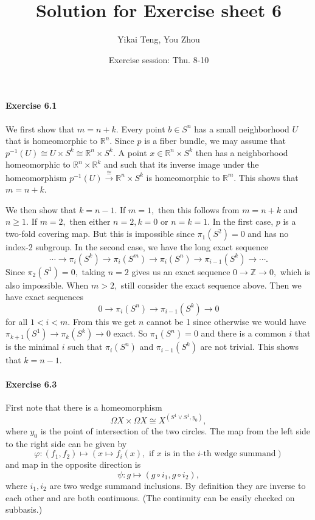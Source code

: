 \documentclass{article}
\title{Solution for Exercise sheet 6}
\author{Yikai Teng, You Zhou}
\date{Exercise session: Thu. 8-10}
\begin{document}
\maketitle
\paragraph{Exercise 6.1}We first show that $m=n+k.$ Every point $b\in S^n$ has a small neighborhood $U$ that is homeomorphic to $\mathbb{R}^n.$ Since $p$ is a fiber bundle, we may assume that $p^{-1}(U)\cong U\times S^k\cong\mathbb{R}^n\times S^k.$ A point $x\in\mathbb{R}^n\times S^k$ then has a neighborhood homeomorphic to $\mathbb{R}^n\times\mathbb{R}^k$ and such that its inverse image under the homeomorphism $p^{-1}(U)\xrightarrow{\cong}\mathbb{R}^n\times S^k$ is homeomorphic to $\mathbb{R}^m.$ This shows that $m=n+k.$

We then show that $k=n-1.$ If $m=1,$ then this follows from $m=n+k$ and $n\geq1.$ If $m=2,$ then either $n=2, k=0$ or $n=k=1.$ In the first case, $p$ is a two-fold covering map. But this is impossible since $\pi_1(S^2)=0$ and has no index-2 subgroup. In the second case, we have the long exact sequence
\[\cdots\rightarrow\pi_i(S^k)\rightarrow\pi_i(S^m)\rightarrow\pi_i(S^n)\rightarrow\pi_{i-1}(S^k)\rightarrow\cdots.\]
Since $\pi_2(S^1)=0,$ taking $n=2$ gives us an exact sequence $0\rightarrow\mathbb{Z}\rightarrow0,$ which is also impossible. When $m>2,$ still consider the exact sequence above. Then we have exact sequences
\[0\rightarrow\pi_i(S^n)\rightarrow\pi_{i-1}(S^k)\rightarrow0\]
for all $1<i<m.$ From this we get $n$ cannot be 1 since otherwise we would have $\pi_{k+1}(S^1)\rightarrow\pi_k(S^k)\rightarrow0$ exact. So $\pi_1(S^n)=0$ and there is a common $i$ that is the minimal $i$ such that $\pi_i(S^n)$ and $\pi_{i-1}(S^k)$ are not trivial. This shows that $k=n-1.$

\paragraph{Exercise 6.3}First note that there is a homeomorphism
\[\Omega X\times \Omega X\cong X^{(S^1\vee S^1, y_0)},\]
where $y_0$ is the point of intersection of the two circles. The map from the left side to the right side can be given by
\[\varphi\colon(f_1,f_2) \mapsto \left(x\mapsto f_i(x),  \text{ if } x\text{ is in the } i\text{-th wedge summand}\right)\]
and map in the opposite direction is
\[\psi\colon g\mapsto(g\circ i_1, g\circ i_2),\]
where $i_1,i_2$ are two wedge summand inclusions. By definition they are inverse to each other and are both continuous. (The continuity can be easily checked on subbasis.)
\end{document}
